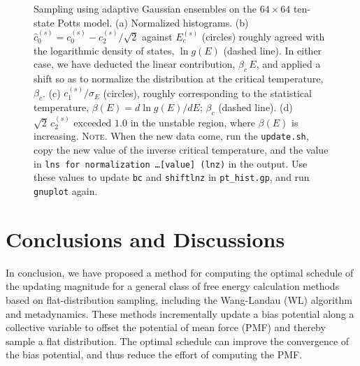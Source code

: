\documentclass[preprint, superscriptaddress, floatfix]{revtex4-1}
\newcommand{\note}[1]{{\color{DarkGreen}\footnotesize \textsc{Note.} #1}}
\begin{document}
\begin{figure}[h]\centering
  \caption{
    \label{fig:pt_hist}
    Sampling using adaptive Gaussian ensembles
    on the $64 \times 64$ ten-state Potts model.
    (a) Normalized histograms.
    (b) $\hat c_0^{(s)} = c_0^{(s)} - c_2^{(s)}/\sqrt 2$ 
    against $E_c^{(s)}$ (circles)
    roughly agreed with the logarithmic density of states,
    $\ln g(E)$ (dashed line).
    In either case,
    we have deducted the linear contribution, $\beta_c \, E$,
    and applied a shift so as to normalize
    the distribution at the critical temperature, $\beta_c$.
    (c) $c_1^{(s)}/\sigma_E$ (circles), roughly corresponding to
    the statistical temperature, $\beta(E) = d\ln g(E)/dE$;
    $\beta_c$ (dashed line).
    (d) $\sqrt 2 \, c_2^{(s)}$
    exceeded $1.0$ in the unstable region,
    where $\beta(E)$ is increasing.
    \note{When the new data come,
    run the \texttt{update.sh},
    copy the new value of the inverse critical temperature,
    and the value in \texttt{lns for normalization \dots [value] (lnz)}
    in the output.
    Use these values to update \texttt{bc} and \texttt{shiftlnz}
    in \texttt{pt\_hist.gp}, and run \texttt{gnuplot} again.  }%
  }
\end{figure}


\section{\label{sec:conclusion}
Conclusions and Discussions}



In conclusion,
we have proposed a method for computing
the optimal schedule of the updating magnitude
for a general class of free energy calculation methods
based on flat-distribution sampling,
including the Wang-Landau (WL) algorithm and metadynamics.
%
These methods
incrementally update a bias potential
along a collective variable
to offset the potential of mean force (PMF)
and thereby sample a flat distribution.
%
The optimal schedule can improve the convergence
of the bias potential,
and thus reduce the effort
of computing the PMF.
\end{document}

